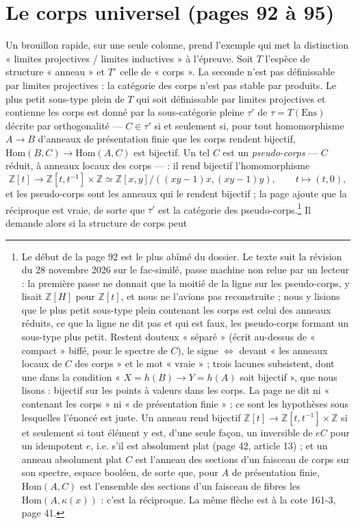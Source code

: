 \documentclass[11pt,a4paper]{article}
\begin{document}
\section*{Le corps universel (pages 92 à 95)}

Un brouillon rapide, sur une seule colonne, prend l'exemple qui met la
distinction « limites projectives / limites inductives » à l'épreuve. Soit
$T$ l'espèce de structure « anneau » et $T^{\circ}$ celle de « corps ». La
seconde n'est pas définissable par limites projectives : la catégorie des
corps n'est pas stable par produits. Le plus petit sous-type plein de $T$
qui soit définissable par limites projectives et contienne les corps est
donné par la sous-catégorie pleine $\tau'$ de $\tau = T(\mathrm{Ens})$ décrite
par orthogonalité — $C \in \tau'$ si et seulement si, pour tout homomorphisme
$A \to B$ d'anneaux de présentation finie que les corps rendent bijectif,
$\mathrm{Hom}(B, C) \to \mathrm{Hom}(A, C)$ est bijectif. Un tel $C$ est un
\emph{pseudo-corps} — $C$ réduit, à anneaux locaux des corps — : il rend
bijectif l'homomorphisme
\[
\mathbb{Z}[t] \longrightarrow \mathbb{Z}[t, t^{-1}] \times \mathbb{Z} \simeq
\mathbb{Z}[x, y]/((xy-1)x, (xy-1)y), \qquad t \mapsto (t, 0),
\]
et les pseudo-corps sont les anneaux qui le rendent bijectif ; la page ajoute
que la réciproque est vraie, de sorte que $\tau'$ est la catégorie des
pseudo-corps.\footnote{Le début de la page 92 est le plus abîmé du
dossier. Le texte suit la révision du 28 novembre 2026 sur le fac-similé, passe machine non relue par un lecteur : la première passe ne donnait que la moitié
de la ligne sur les pseudo-corps, y lisait $\mathbb{Z}[H]$ pour
$\mathbb{Z}[t]$, et nous ne l'avions pas reconstruite ; nous y lisions que le
plus petit sous-type plein contenant les corps est celui des anneaux
réduits, ce que la ligne ne dit pas et qui est faux, les pseudo-corps
formant un sous-type plus petit. Restent douteux « séparé » (écrit
au-dessus de « compact » biffé, pour le spectre de $C$), le signe
$\Longleftrightarrow$ devant « les anneaux locaux de $C$ des corps » et le
mot « vraie » ; trois lacunes subsistent, dont une dans la condition
« $X = h(B) \to Y = h(A)$ soit bijectif », que nous lisons : bijectif sur
les points à valeurs dans les corps. La page ne dit ni « contenant les
corps » ni « de présentation finie » ; ce sont les hypothèses sous
lesquelles l'énoncé est juste. Un anneau rend bijectif $\mathbb{Z}[t] \to
\mathbb{Z}[t, t^{-1}] \times \mathbb{Z}$ si et seulement si tout élément y
est, d'une seule façon, un inversible de $eC$ pour un idempotent $e$, i.e.
s'il est absolument plat (page 42, article 13) ; et un anneau absolument
plat $C$ est l'anneau des sections d'un faisceau de corps sur son spectre,
espace booléen, de sorte que, pour $A$ de présentation finie,
$\mathrm{Hom}(A, C)$ est l'ensemble des sections d'un faisceau de fibres
les $\mathrm{Hom}(A, \kappa(x))$ : c'est la réciproque. La même flèche est
à la cote 161-3, page 41.} Il demande alors si la structure de corps peut
\end{document}
